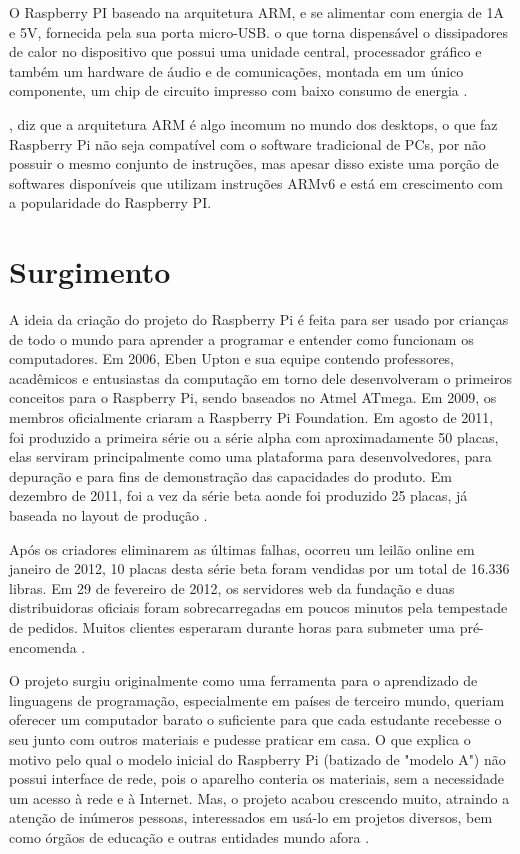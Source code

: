 \documentclass[
	12pt,				%
	openright,			%
	twoside,			%
	a4paper,			%
	chapter=TITLE,		%
	english,			%
	brazil				%
	]{abntex2}
\begin{document}
O Raspberry PI baseado na arquitetura ARM, e se alimentar com energia de 1A e 5V, fornecida pela sua porta micro-USB. o que torna dispensável o dissipadores de calor no dispositivo que possui uma unidade central, processador gráfico e também um hardware de áudio e de comunicações, montada em um único componente, um chip de circuito impresso com baixo consumo de energia \cite{eben2013raspberry}.

, diz que a arquitetura ARM é algo incomum no mundo dos desktops, o que faz Raspberry Pi não seja compatível com o software tradicional de PCs, por não possuir o mesmo conjunto de instruções, mas apesar disso existe uma porção de softwares disponíveis que utilizam instruções ARMv6 e está em crescimento com a popularidade do Raspberry PI. 

\section{Surgimento}

A ideia da criação do projeto do Raspberry Pi é feita para ser usado por crianças de todo o mundo para aprender a programar e entender como funcionam os computadores. Em 2006, Eben Upton e sua equipe contendo professores, acadêmicos e entusiastas da computação em torno dele  desenvolveram o primeiros conceitos para o Raspberry Pi, sendo baseados no Atmel ATmega. Em 2009, os membros oficialmente criaram a Raspberry Pi Foundation. Em agosto de 2011, foi produzido a primeira série ou a série alpha com  aproximadamente 50 placas, elas serviram principalmente como uma plataforma para desenvolvedores, para depuração e para fins de demonstração das capacidades do produto. Em dezembro de 2011, foi a vez da série beta aonde foi produzido 25 placas, já baseada no layout de produção \cite{Werner.Raspberry,raspberrypi.org}.

Após os criadores eliminarem as últimas falhas, ocorreu um leilão online em janeiro de 2012, 10 placas desta série beta foram vendidas por um total de 16.336 libras. Em 29 de fevereiro de 2012, os servidores web da fundação e duas distribuidoras oficiais foram sobrecarregadas em poucos minutos pela tempestade de pedidos. Muitos clientes esperaram durante horas para submeter uma pré-encomenda \cite{Werner.Raspberry}.


O projeto surgiu originalmente como uma ferramenta para o aprendizado de linguagens de programação, especialmente em países de terceiro mundo, queriam oferecer um computador barato o suficiente para que cada estudante recebesse o seu junto com outros materiais e pudesse praticar em casa. O que explica o motivo pelo qual o modelo inicial do Raspberry Pi (batizado de "modelo A") não possui interface de rede, pois o aparelho conteria os materiais, sem a necessidade um acesso à rede e à Internet. Mas, o projeto acabou crescendo muito, atraindo a atenção de inúmeros pessoas, interessados em usá-lo em projetos diversos, bem como órgãos de educação e outras entidades mundo afora \cite{ClubeHardware}.
\end{document}
